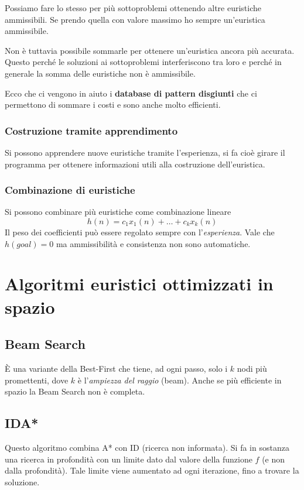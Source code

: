 Possiamo fare lo stesso per pi\`u sottoproblemi ottenendo altre euristiche
ammissibili. Se prendo quella con valore massimo ho sempre un'euristica ammissibile.

Non \`e tuttavia possibile sommarle per ottenere un'euristica ancora pi\`u accurata. Questo
perch\'e le soluzioni ai sottoproblemi interferiscono tra loro e perch\'e in generale la somma
delle euristiche non \`e ammissibile.

Ecco che ci vengono in aiuto i \textbf{database di pattern disgiunti} che ci permettono di
sommare i costi e sono anche molto efficienti.

\subsubsection{Costruzione tramite apprendimento}
Si possono apprendere nuove euristiche tramite l'esperienza, si fa cio\`e girare il programma
per ottenere informazioni utili alla costruzione dell'euristica.

\subsubsection{Combinazione di euristiche}
Si possono combinare pi\`u euristiche come combinazione lineare
\[ h(n) = c_1 x_1(n) + \dots + c_k x_k(n) \]
Il peso dei coefficienti pu\`o essere regolato sempre con l'\emph{esperienza}. Vale che $h(goal) = 0$
ma ammissibilit\`a e consistenza non sono automatiche.

\section{Algoritmi euristici ottimizzati in spazio}
\subsection{Beam Search}
\`E una variante della Best-First che tiene, ad ogni passo, solo i $k$ nodi pi\`u
promettenti, dove $k$ \`e l'\emph{ampiezza del raggio} (beam). Anche se pi\`u efficiente
in spazio la Beam Search non \`e completa.

\subsection{IDA*}
Questo algoritmo combina A* con ID (ricerca non informata). Si fa in sostanza una ricerca in
profondit\`a con un limite dato dal valore della funzione $f$ (e non dalla profondit\`a).
Tale limite viene aumentato ad ogni iterazione, fino a trovare la soluzione.


